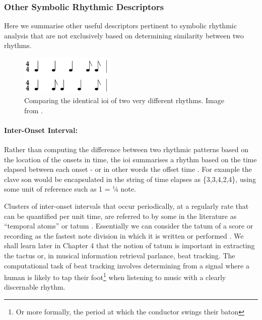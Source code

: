 \subsubsection{Other Symbolic Rhythmic Descriptors}

Here we summarise other useful descriptors pertinent to symbolic rhythmic analysis that are not exclusively based on determining similarity between two rhythms.

\begin{figure}
	\begin{center}
		\includegraphics[width=0.4\textwidth]{ch03_symbolic/figures/ioi_comparison.png}
	\end{center}
	\caption[Comparing the identical IOI of two very different rhythms.]{Comparing the identical \acrshort{ioi} of two very different rhythms. Image from \cite{Dixon2004}.}
	\label{fig:ioi_comparison}
\end{figure}


\paragraph{Inter-Onset Interval:} 
Rather than computing the difference between two rhythmic patterns based on the location of the onsets in time, the \acrfull{ioi} summarises a rhythm based on the time elapsed between each onset - or in other words the offset time \citep{Toussaint2013}. For example the clave son would be encapsulated in the string of time elapses as \{3,3,4,2,4\}, using some unit of reference such as 1 = ¼ note. 

Clusters of inter-onset intervals that occur periodically, at a regularly rate that can be quantified per unit time, are referred to by some in the literature as “temporal atoms” or tatum \citep{Bilmes1993, Sethares2007, Jehan2005}. Essentially we can consider the tatum of a score or recording as the fastest note division in which it is written or performed \citep{Sethares2007}. We shall learn later in Chapter 4 that the notion of tatum is important in extracting the tactus or, in musical information retrieval parlance, beat tracking. The computational task of beat tracking involves determining from a signal where a human is likely to tap their foot\footnote{Or more formally, the period at which the conductor swings their baton} when listening to music with a clearly discernable rhythm. 

